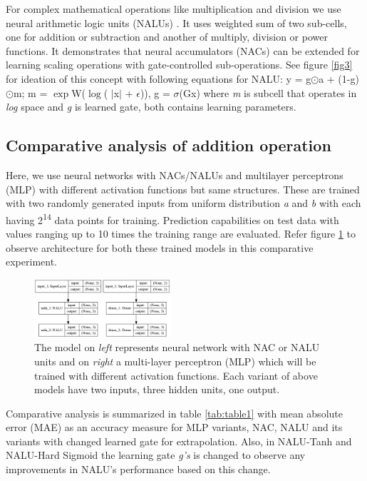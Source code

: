 \documentclass[conference]{IEEEtran}
\begin{document}
For complex mathematical operations like multiplication and division we use neural arithmetic logic units (NALUs) \cite{b5}. It uses weighted sum of two sub-cells, one for addition or subtraction and another of multiply, division or power functions. It demonstrates that neural accumulators (NACs) can be extended for learning scaling operations with gate-controlled sub-operations. See figure \ref{fig3} for ideation of this concept with following equations for NALU: y = g$\odot$a + (1-g)$\odot$m; m = $\exp$W($\log$( $\mid$x$\mid$ + $\epsilon$)), g = $\sigma$(Gx) where \textit{m} is subcell that operates in \textit{log} space and \textit{g} is learned gate, both contains learning parameters.


\subsection{Comparative analysis of addition operation}

Here, we use neural networks with NACs/NALUs and multilayer perceptrons (MLP) with different activation functions but same structures. These are trained with two randomly generated inputs from uniform distribution \textit{a} and \textit{b} with each having 2\textsuperscript{14} data points for training. Prediction capabilities on test data with values ranging up to 10 times the training range are evaluated. Refer figure \ref{fig4} to observe architecture for both these trained models in this comparative experiment.

\begin{figure}[!h]
\centering
\includegraphics[width=0.45\textwidth]{assets/mlp-models.pdf}
\caption{The model on \textit{left} represents neural network with NAC or NALU units and on \textit{right} a multi-layer perceptron (MLP) which will be trained with different activation functions. Each variant of above models have two inputs, three hidden units, one output.}
\label{fig4}
\end{figure}

Comparative analysis is summarized in table  \ref{tab:table1} with mean absolute error (MAE) as an accuracy measure for MLP variants, NAC, NALU and its variants with changed learned gate for extrapolation. Also, in NALU-Tanh and NALU-Hard Sigmoid the learning gate \textit{g's} is changed to observe any improvements in NALU's performance based on this change.
\end{document}
